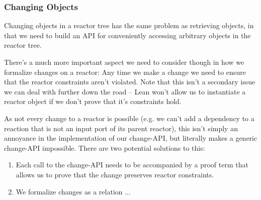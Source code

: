 \subsubsection{Changing Objects}

Changing objects in a reactor tree has the same problem as retrieving objects, in that we need to build an API for conveniently accessing arbitrary objects in the reactor tree.

There's a much more important aspect we need to consider though in how we formalize changes on a reactor:
Any time we make a change we need to ensure that the reactor constraints aren't violated.
Note that this isn't a secondary issue we can deal with further down the road -- Lean won't allow us to instantiate a reactor object if we don't prove that it's constraints hold.

As not every change to a reactor is possible (e.g. we can't add a dependency to a reaction that is not an input port of its parent reactor), this isn't simply an annoyance in the implementation of our change-API, but literally makes a generic change-API impossible.
There are two potential solutions to this:

\begin{enumerate}
  \item Each call to the change-API needs to be accompanied by a proof term that allows us to prove that the change preserves reactor constraints.
  \item We formalize changes as a relation ...
\end{enumerate}
